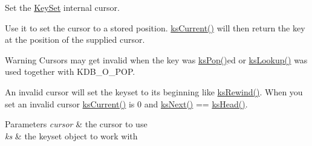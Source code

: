 Set the \mbox{\hyperlink{classkdb_1_1KeySet}{Key\+Set}} internal cursor. 

Use it to set the cursor to a stored position. \mbox{\hyperlink{group__keyset_ga4287b9416912c5f2ab9c195cb74fb094}{ks\+Current()}} will then return the key at the position of the supplied cursor.

\begin{DoxyWarning}{Warning}
Cursors may get invalid when the key was \mbox{\hyperlink{group__keyset_gae42530b04defb772059de0600159cf69}{ks\+Pop()}}ed or \mbox{\hyperlink{group__keyset_gaa34fc43a081e6b01e4120daa6c112004}{ks\+Lookup()}} was used together with K\+D\+B\+\_\+\+O\+\_\+\+P\+OP.
\end{DoxyWarning}

\begin{DoxyCode}{0}
\DoxyCodeLine{\textcolor{comment}{// key now in any position here}}
\end{DoxyCode}


An invalid cursor will set the keyset to its beginning like \mbox{\hyperlink{group__keyset_gabe793ff51f1728e3429c84a8a9086b70}{ks\+Rewind()}}. When you set an invalid cursor \mbox{\hyperlink{group__keyset_ga4287b9416912c5f2ab9c195cb74fb094}{ks\+Current()}} is 0 and \mbox{\hyperlink{group__keyset_ga317321c9065b5a4b3e33fe1c399bcec9}{ks\+Next()}} == \mbox{\hyperlink{group__keyset_gae7dbf3aef70e67b5328475eb3d1f92f5}{ks\+Head()}}.


\begin{DoxyParams}{Parameters}
{\em cursor} & the cursor to use \\
\hline
{\em ks} & the keyset object to work with \\
\hline
\end{DoxyParams}

